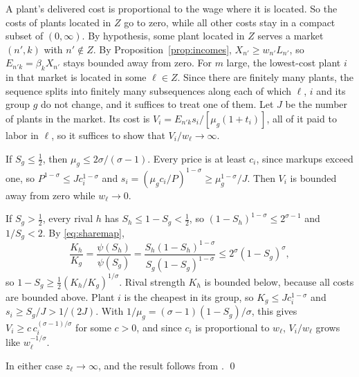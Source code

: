 \documentclass[11pt]{article}
\begin{document}
A plant's delivered cost is proportional to the wage where it is located. So the costs
of plants located in $Z$ go to zero, while all other costs stay in a compact subset of
$(0,\infty)$. By hypothesis, some plant located in $Z$ serves a market $(n',k)$ with
$n'\notin Z$. By Proposition~\ref{prop:incomes}, $X_{n'}\ge w_{n'}L_{n'}$, so
$E_{n'k}=\beta_kX_{n'}$ stays bounded away from zero. For $m$ large, the lowest-cost
plant $i$ in that market is located in some $\ell\in Z$. Since there are finitely many
plants, the sequence splits into finitely many subsequences along each of which $\ell$,
$i$ and its group $g$ do not change, and it suffices to treat one of them. Let $J$ be the number of plants in the market. Its cost is $V_i=E_{n'k}s_i/[\mu_g(1+t_i)]$, all of
it paid to labor in $\ell$, so it suffices to show that $V_i/w_\ell\to\infty$.

If $S_g\le\frac12$, then $\mu_g\le2\sigma/(\sigma-1)$. Every price is at least $c_i$,
since markups exceed one, so $P^{1-\sigma}\le Jc_i^{1-\sigma}$ and
$s_i=(\mu_gc_i/P)^{1-\sigma}\ge\mu_g^{1-\sigma}/J$. Then $V_i$ is bounded away from zero
while $w_\ell\to0$.

If $S_g>\frac12$, every rival $h$ has $S_h\le1-S_g<\frac12$, so
$(1-S_h)^{1-\sigma}\le2^{\sigma-1}$ and $1/S_g<2$. By \eqref{eq:sharemap},
\[
  \frac{K_h}{K_g}=\frac{\psi(S_h)}{\psi(S_g)}
  =\frac{S_h(1-S_h)^{1-\sigma}}{S_g(1-S_g)^{1-\sigma}}
  \le2^{\sigma}(1-S_g)^{\sigma},
\]
so $1-S_g\ge\frac12(K_h/K_g)^{1/\sigma}$. Rival strength $K_h$ is bounded below, because
all costs are bounded above. Plant $i$ is the cheapest in its group, so
$K_g\le Jc_i^{1-\sigma}$ and $s_i\ge S_g/J>1/(2J)$. With $1/\mu_g=(\sigma-1)(1-S_g)/\sigma$,
this gives $V_i\ge c\,c_i^{(\sigma-1)/\sigma}$ for some $c>0$, and since $c_i$ is
proportional to $w_\ell$, $V_i/w_\ell$ grows like $w_\ell^{-1/\sigma}$.

In either case $z_\ell\to\infty$, and the result follows from
\citet[Proposition 17.C.1]{MWG1995}. \qed
\end{document}
